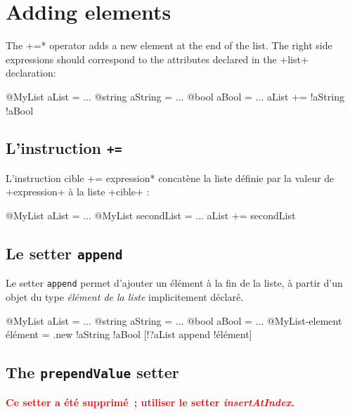 \section{Adding elements}


The  \ggsq*+=* operator adds a new element at the end of the list. The right side expressions should correspond to the attributes declared in the \ggsq+list+ declaration:\\

\begin{galgas4}
@MyList aList = ...
@string aString = ...
@bool aBool = ...
aList += !aString !aBool
\end{galgas4}


\subsection{L'instruction \texttt{+=}}

L'instruction \ggsq*cible += expression* concatène la liste définie par la valeur de \ggsq+expression+ à la liste \ggsq+cible+ :

\begin{galgas4}
@MyList aList = ...
@MyList secondList = ...
aList += secondList
\end{galgas4}







\subsection{Le setter \texttt{append}}

Le setter \texttt{append} permet d'ajouter un élément à la fin de la liste, à partir d'un objet du type \emph{élément de la liste} implicitement déclaré.


\begin{galgas4}
@MyList aList = ...
@string aString = ...
@bool aBool = ...
@MyList-element élément = .new {!aString !aBool}
[!?aList append !élément]
\end{galgas4}


\subsection{The \texttt{prependValue} setter}

{\bf \textcolor{red}{Ce setter a été supprimé~; utiliser le setter \emph{insertAtIndex}.}}

